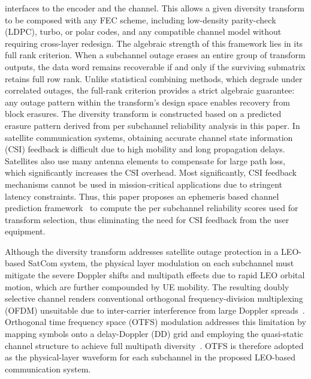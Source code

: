 \documentclass[lettersize,journal]{IEEEtran}
\begin{document}
interfaces to the encoder and the channel. This allows a given diversity transform to be composed with any FEC scheme, including low-density parity-check (LDPC), turbo, or polar codes, and any compatible channel model without requiring cross-layer redesign. The algebraic strength of this framework lies in its full rank criterion. When a subchannel outage erases an entire group of transform outputs, the data word remains recoverable if and only if the surviving submatrix retains full row rank. Unlike statistical combining methods, which degrade under correlated outages, the full-rank criterion provides a strict algebraic guarantee: any outage pattern within the transform’s design space enables recovery from block erasures.
The diversity transform is constructed based on a predicted erasure 
pattern derived from per subchannel reliability analysis in this paper. In satellite communication systems, obtaining accurate channel state information (CSI) feedback is difficult due to high mobility and long propagation delays. Satellites also use many antenna elements to compensate for large path loss, which significantly increases the CSI overhead. Most significantly, CSI feedback mechanisms cannot be used in mission‑critical applications due to stringent latency constraints. Thus, this paper proposes an ephemeris based channel prediction framework~\cite{10902219} to compute the per subchannel reliability scores used for transform selection, thus eliminating the need for CSI feedback from the user equipment.

Although the diversity transform addresses satellite outage protection in a LEO-based SatCom system, the physical layer modulation on each subchannel must mitigate the severe Doppler shifts and multipath effects due to rapid LEO orbital motion, which are further compounded by UE mobility. The resulting doubly selective channel renders conventional orthogonal frequency-division multiplexing (OFDM) unsuitable due to inter-carrier interference from large Doppler spreads~\cite{Li2021}. Orthogonal time frequency space (OTFS) modulation addresses this limitation by mapping symbols onto a delay-Doppler (DD) grid and employing the quasi-static channel structure to achieve full multipath diversity~\cite{Hadani2017,Raviteja2018}. OTFS is therefore adopted as the physical-layer waveform for each subchannel in the proposed LEO-based communication system.
\end{document}
